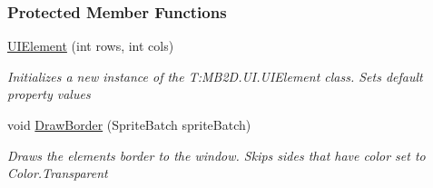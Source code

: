\subsubsection*{Protected Member Functions}
\begin{DoxyCompactItemize}
\item 
\hyperlink{class_m_b2_d_1_1_u_i_1_1_u_i_element_a508bd28173afc58ba1214672a013f802}{U\+I\+Element} (int rows, int cols)
\begin{DoxyCompactList}\small\item\em Initializes a new instance of the T\+:\+M\+B2\+D.\+U\+I.\+U\+I\+Element class. Sets default property values \end{DoxyCompactList}\item 
void \hyperlink{class_m_b2_d_1_1_u_i_1_1_u_i_element_a0a17b121a60ad05039f01eee006ae76c}{Draw\+Border} (Sprite\+Batch sprite\+Batch)
\begin{DoxyCompactList}\small\item\em Draws the elements border to the window. Skips sides that have color set to Color.\+Transparent \end{DoxyCompactList}\end{DoxyCompactItemize}
